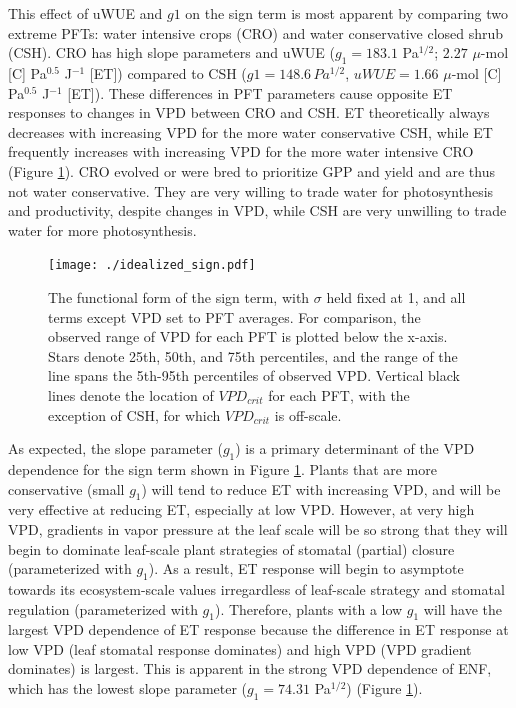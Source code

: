 \documentclass[draft,linenumbers]{agujournal}
\begin{document}
This effect of uWUE and $g1$ on the sign term is most apparent by
comparing two extreme PFTs: water intensive crops (CRO) and water
conservative closed shrub (CSH). CRO has high slope parameters and
uWUE ($g_1 = 183.1$ Pa$^{1/2}$; $2.27$ $\mu$-mol [C] Pa$^{0.5}$
J$^{-1}$ [ET]) compared to CSH ($g1 = 148.6 \, Pa^{1/2}$, $uWUE=1.66$
$\mu$-mol [C] Pa$^{0.5}$ J$^{-1}$ [ET]). These differences in PFT
parameters cause opposite ET responses to changes in VPD between CRO
and CSH. ET theoretically always decreases with increasing VPD for the
more water conservative CSH, while ET frequently increases with
increasing VPD for the more water intensive CRO (Figure
\ref{idealized_sign}). CRO evolved or were bred to prioritize GPP and
yield and are thus not water conservative. They are very willing to
trade water for photosynthesis and productivity, despite changes in
VPD, while CSH are very unwilling to trade water for more
photosynthesis.

\begin{figure} \centering
\texttt{[image: ./idealized\_sign.pdf]}
\caption{The functional form of the sign term, with $\sigma$ held
fixed at 1, and all terms except VPD set to PFT averages. For
comparison, the observed range of VPD for each PFT is plotted below
the x-axis. Stars denote 25th, 50th, and 75th percentiles, and the
range of the line spans the 5th-95th percentiles of observed
VPD. Vertical black lines denote the location of $VPD_{crit}$ for each
PFT, with the exception of CSH, for which $VPD_{crit}$ is off-scale.}
\label{idealized_sign}
\end{figure}


As expected, the slope parameter ($g_1$) is a primary determinant of
the VPD dependence for the sign term shown in Figure
\ref{idealized_sign}. Plants that are more conservative (small $g_1$)
will tend to reduce ET with increasing VPD, and will be very effective
at reducing ET, especially at low VPD. However, at very high VPD,
gradients in vapor pressure at the leaf scale will be so strong that
they will begin to dominate leaf-scale plant strategies of stomatal
(partial) closure (parameterized with $g_1$). As a result, ET response
will begin to asymptote towards its ecosystem-scale values
irregardless of leaf-scale strategy and stomatal regulation
(parameterized with $g_1$). Therefore, plants with a low $g_1$ will
have the largest VPD dependence of ET response because the difference
in ET response at low VPD (leaf stomatal response dominates) and high
VPD (VPD gradient dominates) is largest. This is apparent in the
strong VPD dependence of ENF, which has the lowest slope parameter
($g_1=74.31$ Pa$^{1/2}$) (Figure \ref{idealized_sign}).
\end{document}

